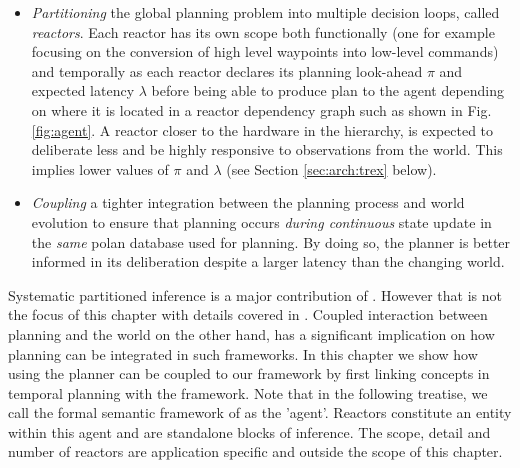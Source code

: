 \begin{itemize}

\item \emph{Partitioning} the global planning problem into multiple
  decision loops, called {\em reactors}. Each reactor has its own
  scope both functionally (one for example focusing on the conversion
  of high level waypoints into low-level commands) and temporally as
  each reactor declares its planning look-ahead $\pi$ and expected
  latency $\lambda$ before being able to produce plan to the agent
  depending on where it is located in a reactor dependency graph such
  as shown in Fig. \ref{fig:agent}. A reactor closer to the hardware
  in the hierarchy, is expected to deliberate less and be highly
  responsive to observations from the world. This implies lower values
  of $\pi$ and $\lambda$ (see Section \ref{sec:arch:trex} below).

\item \emph{Coupling} a tighter integration between the planning
  process and world evolution to ensure that planning occurs
  \emph{during continuous} state update in the {\em same} polan
  database used for planning. By doing so, the planner is
  better informed in its deliberation despite a larger latency than
  the changing world. 
\end{itemize}

Systematic partitioned inference is a major contribution of
\rxe. However that is not the focus of this chapter with details
covered in \cite{py10, rajan12}. Coupled interaction between planning
and the world on the other hand, has a significant implication on how
planning can be integrated in such frameworks. In this chapter we show
how using the \eu planner can be coupled to our framework by first
linking concepts in temporal planning with the \rx framework. Note
that in the following treatise, we call the formal semantic framework
of \rx as the 'agent'. Reactors constitute an entity within this agent
and are standalone blocks of inference. The scope, detail and number
of reactors are application specific and outside the scope of this
chapter.


